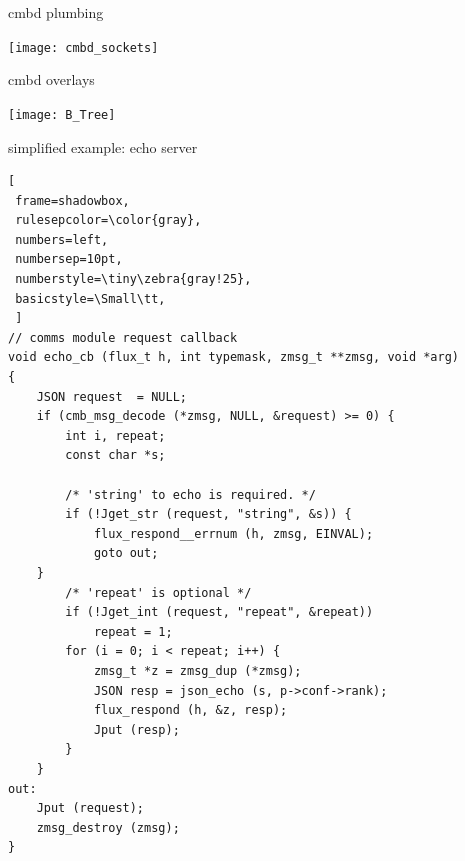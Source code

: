 \documentclass[default,pdf,colorBG,slideColor]{prosper}
\makeatletter
\newcommand\Small{\fontsize{6}{6.2}\selectfont}
\newcommand\realnumberstyle[1]{}
\newcommand{\zebra}[2]{%
    {\realnumberstyle{#2}}%
    \begingroup
    \lst@basicstyle
    \ifodd\value{lstnumber}%
        \color{#1}%
        \rlap{\hspace*{\lst@numbersep}%
        \color@block{\linewidth}{\ht\strutbox}{\dp\strutbox}%
        }%
    \fi
    \endgroup
}
\makeatother
\begin{document}
\begin{slide}{cmbd plumbing}{\small
\begin{center}
  \texttt{[image: cmbd\_sockets]}
\end{center}
}\end{slide}

\begin{slide}{cmbd overlays}{\small
\begin{center}
  \texttt{[image: B\_Tree]}
\end{center}
}\end{slide}

\begin{slide}{simplified example: echo server}
{\tiny\bf
\begin{lstlisting}[
 frame=shadowbox,
 rulesepcolor=\color{gray},
 numbers=left,
 numbersep=10pt,
 numberstyle=\tiny\zebra{gray!25},
 basicstyle=\Small\tt,
 ]
// comms module request callback
void echo_cb (flux_t h, int typemask, zmsg_t **zmsg, void *arg)
{
    JSON request  = NULL;
    if (cmb_msg_decode (*zmsg, NULL, &request) >= 0) {
        int i, repeat;
        const char *s;

        /* 'string' to echo is required. */
        if (!Jget_str (request, "string", &s)) {
            flux_respond__errnum (h, zmsg, EINVAL);
            goto out;
	}
        /* 'repeat' is optional */
        if (!Jget_int (request, "repeat", &repeat))
            repeat = 1;
        for (i = 0; i < repeat; i++) {
            zmsg_t *z = zmsg_dup (*zmsg);
            JSON resp = json_echo (s, p->conf->rank);
            flux_respond (h, &z, resp);
            Jput (resp);
        }
    }
out:
    Jput (request);
    zmsg_destroy (zmsg);
}
\end{lstlisting}
} \end{slide}
\end{document}
